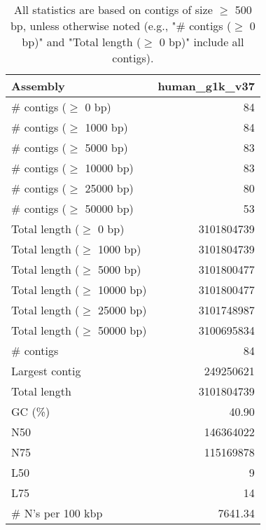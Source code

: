 \documentclass[12pt,a4paper]{article}
\begin{document}
\begin{table}[ht]
\begin{center}
\caption{All statistics are based on contigs of size $\geq$ 500 bp, unless otherwise noted (e.g., "\# contigs ($\geq$ 0 bp)" and "Total length ($\geq$ 0 bp)" include all contigs).}
\begin{tabular}{|l*{1}{|r}|}
\hline
Assembly & human\_g1k\_v37 \\ \hline
\# contigs ($\geq$ 0 bp) & 84 \\ \hline
\# contigs ($\geq$ 1000 bp) & 84 \\ \hline
\# contigs ($\geq$ 5000 bp) & 83 \\ \hline
\# contigs ($\geq$ 10000 bp) & 83 \\ \hline
\# contigs ($\geq$ 25000 bp) & 80 \\ \hline
\# contigs ($\geq$ 50000 bp) & 53 \\ \hline
Total length ($\geq$ 0 bp) & 3101804739 \\ \hline
Total length ($\geq$ 1000 bp) & 3101804739 \\ \hline
Total length ($\geq$ 5000 bp) & 3101800477 \\ \hline
Total length ($\geq$ 10000 bp) & 3101800477 \\ \hline
Total length ($\geq$ 25000 bp) & 3101748987 \\ \hline
Total length ($\geq$ 50000 bp) & 3100695834 \\ \hline
\# contigs & 84 \\ \hline
Largest contig & 249250621 \\ \hline
Total length & 3101804739 \\ \hline
GC (\%) & 40.90 \\ \hline
N50 & 146364022 \\ \hline
N75 & 115169878 \\ \hline
L50 & 9 \\ \hline
L75 & 14 \\ \hline
\# N's per 100 kbp & 7641.34 \\ \hline
\end{tabular}
\end{center}
\end{table}
\end{document}
